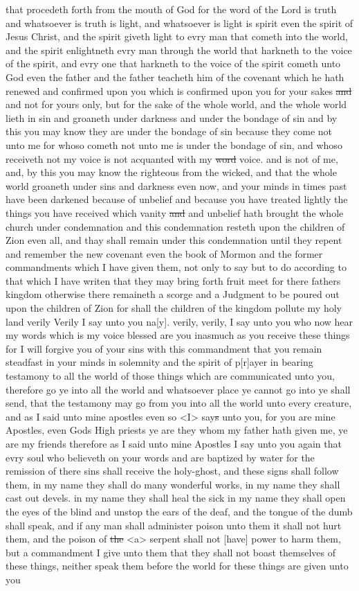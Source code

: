 that procedeth forth from the mouth of God for the word of the Lord is truth and whatsoever is truth is light, and whatsoever is light is spirit even the spirit of Jesus Christ, and the spirit giveth light to evry man that cometh into the world, and the spirit enlightneth evry man through the world that harkneth to the voice of the spirit, and evry one that harkneth to the voice of the spirit cometh unto God even the father and the father teacheth him of the covenant which he hath renewed and confirmed upon you which is confirmed upon you for your sakes \sout{and} and not for yours only, but for the sake of the whole world, and the whole world lieth in sin and groaneth under darkness and under the bondage of sin and by this you may know they are under the bondage of sin because they come not unto me for whoso cometh not unto me is under the bondage of sin, and whoso receiveth not my voice is not acquanted with my \sout{word} voice. and is not of me, and, by this you may know the righteous from the wicked, and that the whole world groaneth under sins and darkness even now, and your minds in times past have been darkened because of unbelief and because you have treated lightly the things you have received which vanity \sout{and} and unbelief hath brought the whole church under condemnation and this condemnation resteth upon the children of Zion even all, and thay shall remain under this condemnation until they repent and remember the new covenant even the book of Mormon and the former commandments which I have given them, not only to say but to do according to that which I have writen that they may bring forth fruit meet for there fathers kingdom otherwise there remaineth a scorge and a Judgment to be poured out upon the children of Zion for shall the children of the kingdom pollute my holy land verily Verily I say unto you na[y]. verily, verily, I say unto you who now hear my words which is my voice blessed are you inasmuch as you receive these things for I will forgive you of your sins with this commandment that you remain steadfast in your minds in solemnity and the spirit of p[r]ayer in bearing testamony to all the world of those things which are communicated unto you, therefore go ye into all the world and whatsoever place ye cannot go into ye shall send, that the testamony may go from you into all the world unto every creature, and as I said unto mine apostles even so <I> say\sout{s} unto you, for you are mine Apostles, even Gods High priests ye are they whom my father hath given me, ye are my friends therefore as I said unto mine Apostles I say unto you again that evry soul who believeth on your words and are baptized by water for the remission of there sins shall receive the holy-ghost, and these signs shall follow them, in my name they shall do many wonderful works, in my name they shall cast out devels. in my name they shall heal the sick in my name they shall open the eyes of the blind and unstop the ears of the deaf, and the tongue of the dumb shall speak, and if any man shall administer poison unto them it shall not hurt them, and the poison of \sout{the} <a> serpent shall not [have] power to harm them, but a commandment I give unto them that they shall not boast themselves of these things, neither speak them before the world for these things are given unto you 